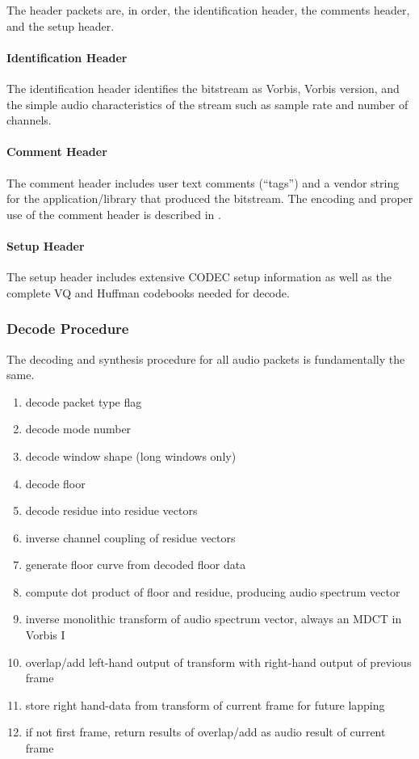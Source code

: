 The header packets are, in order, the identification
header, the comments header, and the setup header.

\paragraph{Identification Header}
The identification header identifies the bitstream as Vorbis, Vorbis
version, and the simple audio characteristics of the stream such as
sample rate and number of channels.

\paragraph{Comment Header}
The comment header includes user text comments (``tags'') and a vendor
string for the application/library that produced the bitstream.  The
encoding and proper use of the comment header is described in .

\paragraph{Setup Header}
The setup header includes extensive CODEC setup information as well as
the complete VQ and Huffman codebooks needed for decode.


\subsubsection{Decode Procedure}

The decoding and synthesis procedure for all audio packets is
fundamentally the same.
\begin{enumerate}
\item decode packet type flag
\item decode mode number
\item decode window shape (long windows only)
\item decode floor
\item decode residue into residue vectors
\item inverse channel coupling of residue vectors
\item generate floor curve from decoded floor data
\item compute dot product of floor and residue, producing audio spectrum vector
\item inverse monolithic transform of audio spectrum vector, always an MDCT in Vorbis I
\item overlap/add left-hand output of transform with right-hand output of previous frame
\item store right hand-data from transform of current frame for future lapping
\item if not first frame, return results of overlap/add as audio result of current frame
\end{enumerate}


